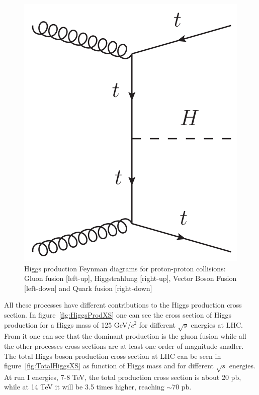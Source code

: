 \begin{figure}[!Hhtbp]
\begin{center}
    \includegraphics[scale=0.45]{figs/QuarkF_H.png}
    \caption{Higgs production Feynman diagrams for proton-proton collisions: Gluon fusion [left-up], Higgstrahlung [right-up], Vector Boson Fusion [left-down] and Quark fusion [right-down]}
    \label{fig:HiggsProd}
  \end{center}
\end{figure}

All these processes have different contributions to the Higgs production cross section. In figure~\ref{fig:HiggsProdXS} one can see the cross section of Higgs production for a Higgs mass of 125 GeV/$c^{2}$ for different $\sqrt{s}$ energies at LHC. From it one can see that the dominant production is the gluon fusion while all the other processes cross sections are at least one order of magnitude smaller. The total Higgs boson production cross section at LHC can be seen in figure~\ref{fig:TotalHiggsXS} as function of Higgs mass and for different $\sqrt{s}$ energies. At run I energies, 7-8 TeV, the total production cross section is about 20 pb, while at 14 TeV it will be 3.5 times higher, reaching $\sim$70 pb. 


